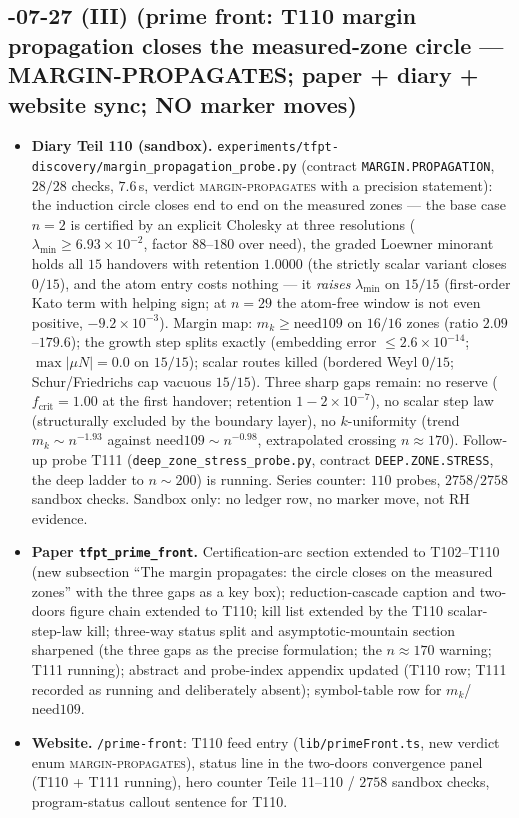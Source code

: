 \documentclass[11pt]{article}
\begin{document}
\subsection*{-07-27 (III) (prime front: T110 margin propagation closes the measured-zone circle --- MARGIN-PROPAGATES; paper + diary + website sync; NO marker moves)}
\begin{itemize}[leftmargin=1.5em]
\item \textbf{Diary Teil 110 (sandbox).} \texttt{experiments/tfpt-discovery/margin\_propagation\_probe.py}
(contract \texttt{MARGIN.PROPAGATION}, $28/28$ checks, $7.6$\,s, verdict \textsc{margin-propagates}
with a precision statement): the induction circle closes end to end on the measured zones --- the
base case $n=2$ is certified by an explicit Cholesky at three resolutions
($\lambda_{\min}\ge6.93\times10^{-2}$, factor $88$--$180$ over need), the graded Loewner minorant
holds all $15$ handovers with retention $1.0000$ (the strictly scalar variant closes $0/15$), and the
atom entry costs nothing --- it \emph{raises} $\lambda_{\min}$ on $15/15$ (first-order Kato term with
helping sign; at $n=29$ the atom-free window is not even positive, $-9.2\times10^{-3}$). Margin map:
$m_k\ge\mathrm{need109}$ on $16/16$ zones (ratio $2.09$--$179.6$); the growth step splits exactly
(embedding error $\le2.6\times10^{-14}$; $\max|\mu N|=0.0$ on $15/15$); scalar routes killed
(bordered Weyl $0/15$; Schur/Friedrichs cap vacuous $15/15$). Three sharp gaps remain: no reserve
($f_{\mathrm{crit}}=1.00$ at the first handover; retention $1-2\times10^{-7}$), no scalar step law
(structurally excluded by the boundary layer), no $k$-uniformity (trend $m_k\sim n^{-1.93}$ against
$\mathrm{need109}\sim n^{-0.98}$, extrapolated crossing $n\approx170$). Follow-up probe T111
(\texttt{deep\_zone\_stress\_probe.py}, contract \texttt{DEEP.ZONE.STRESS}, the deep ladder to
$n\sim200$) is running. Series counter: $110$ probes, $2758/2758$ sandbox checks. Sandbox only: no
ledger row, no marker move, not RH evidence.
\item \textbf{Paper \texttt{tfpt\_prime\_front}.} Certification-arc section extended to T102--T110
(new subsection ``The margin propagates: the circle closes on the measured zones'' with the three
gaps as a key box); reduction-cascade caption and two-doors figure chain extended to T110; kill list
extended by the T110 scalar-step-law kill; three-way status split and asymptotic-mountain section
sharpened (the three gaps as the precise formulation; the $n\approx170$ warning; T111 running);
abstract and probe-index appendix updated (T110 row; T111 recorded as running and deliberately
absent); symbol-table row for $m_k$/$\mathrm{need109}$.
\item \textbf{Website.} \texttt{/prime-front}: T110 feed entry (\texttt{lib/primeFront.ts}, new
verdict enum \textsc{margin-propagates}), status line in the two-doors convergence panel (T110 +
T111 running), hero counter Teile 11--110 / $2758$ sandbox checks, program-status callout sentence
for T110.
\end{itemize}
\end{document}
